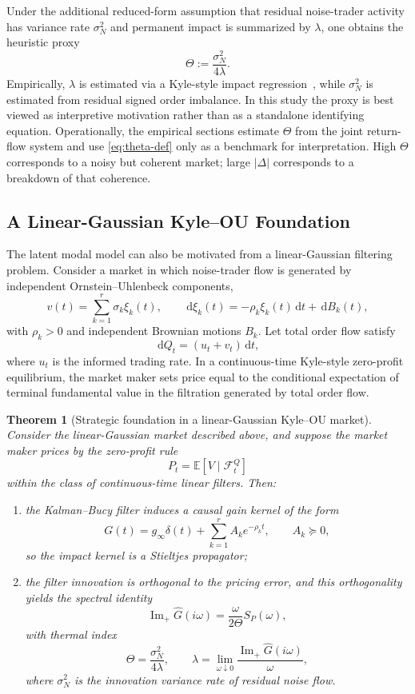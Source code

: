 \documentclass[11pt]{article}
\newtheorem{theorem}{Theorem}[section]
\newcommand{\E}{\mathbb{E}}
\newcommand{\Ghat}{\widehat{G}}
\newcommand{\ImPart}{\operatorname{Im}_{\!+}}
\newcommand{\dd}{\,\mathrm{d}}
\begin{document}
Under the additional reduced-form assumption that residual noise-trader activity has variance rate $\sigma_N^2$ and permanent impact is summarized by $\lambda$, one obtains the heuristic proxy
\begin{equation}\label{eq:theta-def}
  \Theta := \frac{\sigma_N^2}{4\lambda}.
\end{equation}
Empirically, $\lambda$ is estimated via a Kyle-style impact regression~\cite{Kyle1985}, while $\sigma_N^2$ is estimated from residual signed order imbalance. In this study the proxy is best viewed as interpretive motivation rather than as a standalone identifying equation. Operationally, the empirical sections estimate $\Theta$ from the joint return-flow system and use \cref{eq:theta-def} only as a benchmark for interpretation. High $\Theta$ corresponds to a noisy but coherent market; large $|\Delta|$ corresponds to a breakdown of that coherence.

\subsection{A Linear-Gaussian Kyle--OU Foundation}
The latent modal model can also be motivated from a linear-Gaussian filtering problem. Consider a market in which noise-trader flow is generated by independent Ornstein--Uhlenbeck components,
\begin{equation}\label{eq:kyle-ou-noise}
  v(t)=\sum_{k=1}^r \sigma_k \xi_k(t),
  \qquad
  \dd \xi_k(t)=-\rho_k \xi_k(t)\dd t + \dd B_k(t),
\end{equation}
with $\rho_k>0$ and independent Brownian motions $B_k$. Let total order flow satisfy
\[
  \dd Q_t=(u_t+v_t)\dd t,
\]
where $u_t$ is the informed trading rate. In a continuous-time Kyle-style zero-profit equilibrium, the market maker sets price equal to the conditional expectation of terminal fundamental value in the filtration generated by total order flow.

\begin{theorem}[Strategic foundation in a linear-Gaussian Kyle--OU market]\label{thm:kyle-ou}
Consider the linear-Gaussian market described above, and suppose the market maker prices by the zero-profit rule
\[
  P_t=\E[V\mid \mathcal F_t^Q]
\]
within the class of continuous-time linear filters. Then:
\begin{enumerate}[label=\arabic*.]
  \item the Kalman--Bucy filter induces a causal gain kernel of the form
  \[
    G(t)=g_\infty \delta(t)+\sum_{k=1}^r A_k e^{-\rho_k t},
    \qquad A_k\succeq 0,
  \]
  so the impact kernel is a Stieltjes propagator;
  \item the filter innovation is orthogonal to the pricing error, and this orthogonality yields the spectral identity
  \[
    \ImPart \Ghat(i\omega)=\frac{\omega}{2\Theta}S_P(\omega),
  \]
  with thermal index
  \[
    \Theta=\frac{\sigma_N^2}{4\lambda},
    \qquad
    \lambda=\lim_{\omega\downarrow 0}\frac{\ImPart \Ghat(i\omega)}{\omega},
  \]
  where $\sigma_N^2$ is the innovation variance rate of residual noise flow.
\end{enumerate}
\end{theorem}
\end{document}
